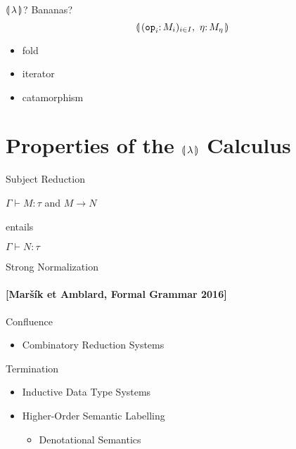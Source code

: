 \documentclass{beamer}
\newcommand{\credit}[1]{\par\hfill \footnotesize \cite{#1}}
\begin{document}


\begin{frame}{${\llparenthesis \, \lambda \, \rrparenthesis}$? Bananas?}
  $$
  \cibanana
  $$

  \pause

  \begin{itemize}
  \item fold
  \item iterator
  \item catamorphism
  \end{itemize}

  \credit{meijer1991functional}
\end{frame}



\section{Properties of the \texorpdfstring{${\llparenthesis \, \lambda \, \rrparenthesis}$}{} Calculus}


\begin{frame}{Subject Reduction}
  \begin{center}
  $\Gamma \vdash M : \tau$ and $M \longrightarrow N$

  entails

  $\Gamma \vdash N : \tau$
  \end{center}
\end{frame}


\begin{frame}{Strong Normalization}
  \framesubtitle{[Maršík et Amblard, Formal Grammar 2016]}
  \nocite{marsik2016introducing}

  \begin{block}{Confluence}
  \begin{itemize}
  \item Combinatory Reduction Systems \cite{klop1993combinatory}
  \end{itemize}
  \end{block}

  \begin{block}{Termination}
  \begin{itemize}
  \item Inductive Data Type Systems \cite{blanqui2000termination}
  \item Higher-Order Semantic Labelling \cite{hamana2007higher}
    \begin{itemize}
    \item Denotational Semantics
    \end{itemize}
  \end{itemize}
  \end{block}
\end{frame}
\end{document}
